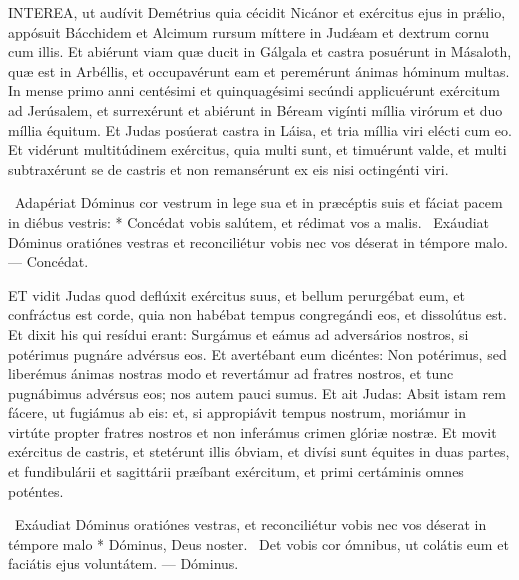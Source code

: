 


\lettrine[lines=2]{I}{NTEREA}, ut audívit Demétrius quia cécidit Nicánor et exércitus ejus in prǽlio, appósuit Bácchidem et Alcimum rursum míttere in Judǽam et dextrum cornu cum illis. Et abiérunt viam quæ ducit in Gálgala et castra posuérunt in Másaloth, quæ est in Arbéllis, et occupavérunt eam et peremérunt ánimas hóminum multas. In mense primo anni centésimi et quinquagésimi secúndi applicuérunt exércitum ad Jerúsalem, et surrexérunt et abiérunt in Béream vigínti míllia virórum et duo míllia équitum. Et Judas posúerat castra in Láisa, et tria míllia viri elécti cum eo. Et vidérunt multitúdinem exércitus, quia multi sunt, et timuérunt valde, et multi subtraxérunt se de castris et non remansérunt ex eis nisi octingénti viri.

\R\ Adapériat Dóminus cor vestrum in lege sua et in præcéptis suis et fáciat pacem in diébus vestris: * Concédat vobis salútem, et rédimat vos a malis. \V\ Exáudiat Dóminus oratiónes vestras et reconciliétur vobis nec vos déserat in témpore malo. — Concédat.


\lettrine[lines=2]{E}{T} vidit Judas quod deflúxit exércitus suus, et bellum perurgébat eum, et confráctus est corde, quia non habébat tempus congregándi eos, et dissolútus est. Et dixit his qui resídui erant: Surgámus et eámus ad adversários nostros, si potérimus pugnáre advérsus eos. Et avertébant eum dicéntes: Non potérimus, sed liberémus ánimas nostras modo et revertámur ad fratres nostros, et tunc pugnábimus advérsus eos; nos autem pauci sumus. Et ait Judas: Absit istam rem fácere, ut fugiámus ab eis: et, si appropiávit tempus nostrum, moriámur in virtúte propter fratres nostros et non inferámus crimen glóriæ nostræ. Et movit exércitus de castris, et stetérunt illis óbviam, et divísi sunt équites in duas partes, et fundibulárii et sagittárii præíbant exércitum, et primi certáminis omnes poténtes.

\R\ Exáudiat Dóminus oratiónes vestras, et reconciliétur vobis nec vos déserat in témpore malo * Dóminus, Deus noster. \V\ Det vobis cor ómnibus, ut colátis eum et faciátis ejus voluntátem. — Dóminus.


